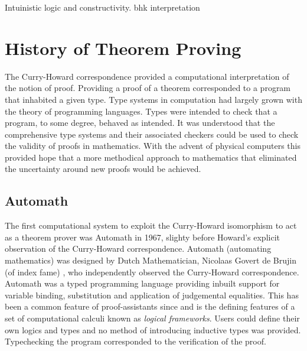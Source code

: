 Intuinistic logic and constructivity. bhk interpretation

\section{History of Theorem Proving}
The Curry-Howard correspondence provided a computational interpretation of the
notion of proof. Providing a proof of a theorem corresponded to a program that
inhabited a given type. Type systems in computation had largely grown with the
theory of programming languages. Types were intended to check that a program, to
some degree, behaved as intended. It was understood that the comprehensive type
systems and their associated checkers could be used to check the validity of
proofs in mathematics. With the advent of physical computers this provided hope
that a more methodical approach to mathematics that eliminated the uncertainty
around new proofs would be achieved.
\subsection{Automath}
The first computational system to exploit the Curry-Howard isomorphism to act as
a theorem prover was Automath in 1967, slighty before Howard's explicit
observation of the Curry-Howard correspondence. Automath (automating
mathematics) was designed by Dutch Mathematician, Nicolaas Govert de Brujin (of
index fame) \cite{de1983automath}, who independently observed the Curry-Howard correspondence.
Automath was a typed programming language providing inbuilt support for variable
binding, substitution and application of judgemental equalities. This has been
a common feature of proof-assistants since and is the defining features of
a set of computational calculi known as \textit{logical frameworks}. Users could
define their own logics and types and no method of introducing inductive types
was provided. Typechecking the program corresponded to the verification of the
proof. 

